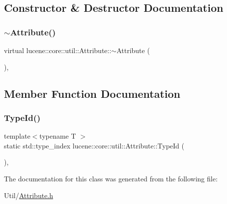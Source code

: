 \subsection{Constructor \& Destructor Documentation}
\mbox{\label{classlucene_1_1core_1_1util_1_1Attribute_aad48274d053d0ec9afd948fea76f7ce9}} 
\subsubsection{\texorpdfstring{$\sim$\+Attribute()}{~Attribute()}}
{\footnotesize\ttfamily virtual lucene\+::core\+::util\+::\+Attribute\+::$\sim$\+Attribute (\begin{DoxyParamCaption}{ }\end{DoxyParamCaption})\hspace{0.3cm}{\ttfamily [inline]}, {\ttfamily [virtual]}}



\subsection{Member Function Documentation}
\mbox{\label{classlucene_1_1core_1_1util_1_1Attribute_a2093d08d843c5a937fff2f3fbdb4341c}} 
\subsubsection{\texorpdfstring{Type\+Id()}{TypeId()}}
{\footnotesize\ttfamily template$<$typename T $>$ \\
static std\+::type\+\_\+index lucene\+::core\+::util\+::\+Attribute\+::\+Type\+Id (\begin{DoxyParamCaption}{ }\end{DoxyParamCaption})\hspace{0.3cm}{\ttfamily [inline]}, {\ttfamily [static]}}



The documentation for this class was generated from the following file\+:\begin{DoxyCompactItemize}
\item 
Util/\mbox{\hyperlink{Util_2Attribute_8h}{Attribute.\+h}}\end{DoxyCompactItemize}

